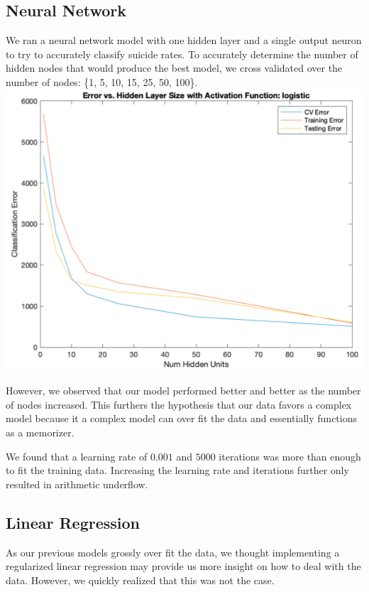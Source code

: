 \documentclass{article}
\begin{document}
\begin{multicols}{2}
\subsection{Neural Network} We ran a neural network model with one hidden layer and a single output neuron to try to accurately classify suicide rates. To accurately determine the number of hidden nodes that would produce the best model, we cross validated over the number of nodes: \{1, 5, 10, 15, 25, 50, 100\}. 
\begingroup
    \includegraphics[width=\columnwidth]{neur-net.png}
    \begin{spacing}{1.2}
    \label{fig:neural_net_fig} 
	\end{spacing}
\endgroup

However, we observed that our model performed better and better as the number of nodes increased. This furthers the hypothesis that our data favors a complex model because it a complex model can over fit the data and essentially functions as a memorizer. 

We found that a learning rate of $0.001$ and $5000$ iterations was more than enough to fit the training data. Increasing the learning rate and iterations further only resulted in arithmetic underflow. 


\subsection{Linear Regression} As our previous models grossly over fit the data, we thought implementing a regularized linear regression may provide us more insight on how to deal with the data. However, we quickly realized that this was not the case.


\end{multicols}
\end{document}
